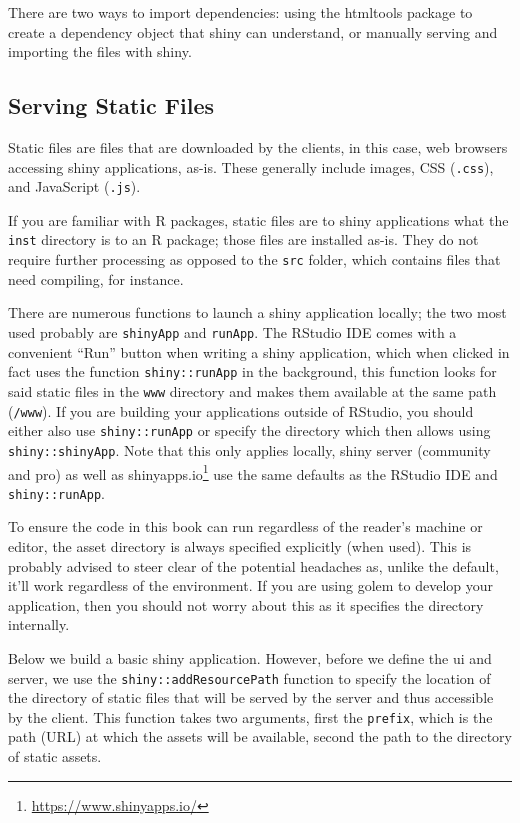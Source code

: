 \documentclass[10pt,]{krantz}
\renewcommand{\href}[2]{#2\footnote{\url{#1}}}
\begin{document}
There are two ways to import dependencies: using the htmltools \citep{R-htmltools} package to create a dependency object that shiny can understand, or manually serving and importing the files with shiny.

\hypertarget{basics-static-files}{%
\subsection{Serving Static Files}\label{basics-static-files}}

Static files are files that are downloaded by the clients, in this case, web browsers accessing shiny applications, as-is. These generally include images, CSS (\texttt{.css}), and JavaScript (\texttt{.js}).

If you are familiar with R packages, static files are to shiny applications what the \texttt{inst} directory is to an R package; those files are installed as-is. They do not require further processing as opposed to the \texttt{src} folder, which contains files that need compiling, for instance.

There are numerous functions to launch a shiny application locally; the two most used probably are \texttt{shinyApp} and \texttt{runApp}. The RStudio IDE comes with a convenient ``Run'' button when writing a shiny application, which when clicked in fact uses the function \texttt{shiny::runApp} in the background, this function looks for said static files in the \texttt{www} directory and makes them available at the same path (\texttt{/www}). If you are building your applications outside of RStudio, you should either also use \texttt{shiny::runApp} or specify the directory which then allows using \texttt{shiny::shinyApp}. Note that this only applies locally, shiny server (community and pro) as well as \href{https://www.shinyapps.io/}{shinyapps.io} use the same defaults as the RStudio IDE and \texttt{shiny::runApp}.

To ensure the code in this book can run regardless of the reader's machine or editor, the asset directory is always specified explicitly (when used). This is probably advised to steer clear of the potential headaches as, unlike the default, it'll work regardless of the environment. If you are using golem \citep{R-golem} to develop your application, then you should not worry about this as it specifies the directory internally.

Below we build a basic shiny application. However, before we define the ui and server, we use the \texttt{shiny::addResourcePath} function to specify the location of the directory of static files that will be served by the server and thus accessible by the client. This function takes two arguments, first the \texttt{prefix}, which is the path (URL) at which the assets will be available, second the path to the directory of static assets.
\end{document}
